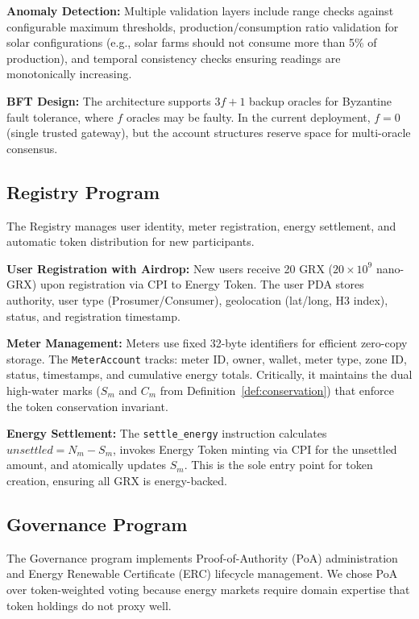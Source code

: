 \documentclass[conference]{IEEEtran}
\begin{document}
\textbf{Anomaly Detection:} Multiple validation layers include range checks against configurable maximum thresholds, production/consumption ratio validation for solar configurations (e.g., solar farms should not consume more than 5\% of production), and temporal consistency checks ensuring readings are monotonically increasing.

\textbf{BFT Design:} The architecture supports $3f+1$ backup oracles for Byzantine fault tolerance, where $f$ oracles may be faulty. In the current deployment, $f=0$ (single trusted gateway), but the account structures reserve space for multi-oracle consensus.

\subsection{Registry Program}
\label{sec:registry}

The Registry manages user identity, meter registration, energy settlement, and automatic token distribution for new participants.

\textbf{User Registration with Airdrop:} New users receive 20 GRX ($20 \times 10^9$ nano-GRX) upon registration via CPI to Energy Token. The user PDA stores authority, user type (Prosumer/Consumer), geolocation (lat/long, H3 index), status, and registration timestamp.

\textbf{Meter Management:} Meters use fixed 32-byte identifiers for efficient zero-copy storage. The \texttt{MeterAccount} tracks: meter ID, owner, wallet, meter type, zone ID, status, timestamps, and cumulative energy totals. Critically, it maintains the dual high-water marks ($S_m$ and $C_m$ from Definition~\ref{def:conservation}) that enforce the token conservation invariant.

\textbf{Energy Settlement:} The \texttt{settle\_energy} instruction calculates $\mathit{unsettled} = N_m - S_m$, invokes Energy Token minting via CPI for the unsettled amount, and atomically updates $S_m$. This is the sole entry point for token creation, ensuring all GRX is energy-backed.

\subsection{Governance Program}
\label{sec:governance}

The Governance program implements Proof-of-Authority (PoA) administration and Energy Renewable Certificate (ERC) lifecycle management. We chose PoA over token-weighted voting because energy markets require domain expertise that token holdings do not proxy well.
\end{document}
